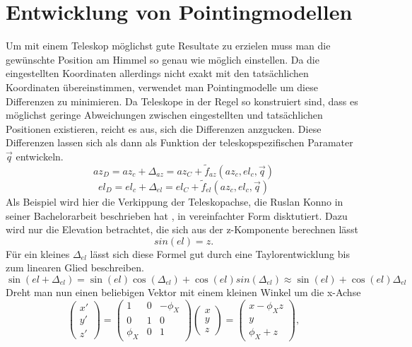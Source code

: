\section{Entwicklung von Pointingmodellen}
Um mit einem Teleskop möglichst gute Resultate zu erzielen muss man die gewünschte Position am Himmel so genau wie möglich einstellen. Da die eingestellten Koordinaten allerdings nicht exakt mit den tatsächlichen Koordinaten übereinstimmen, verwendet man Pointingmodelle um diese Differenzen zu minimieren. Da Teleskope in der Regel so konstruiert sind, dass es möglichst geringe Abweichungen zwischen eingestellten und tatsächlichen Positionen existieren, reicht es aus, sich die Differenzen anzgucken. Diese Differenzen lassen sich als dann als Funktion der teleskopspezifischen Paramater $\vec{q}$ entwickeln.
\begin{equation}
az_D=az_c+\Delta_{az}=az_C+\tilde{f}_{az}\left(az_c,el_c,\vec{q}\right)
\end{equation}
\begin{equation}
el_D=el_c+\Delta_{el}=el_C+\tilde{f}_{el}\left(az_c,el_c,\vec{q}\right)
\label{eq:pointingZero}
\end{equation}
Als Beispiel wird hier die Verkippung der Teleskopachse, die Ruslan Konno in seiner Bachelorarbeit beschrieben hat \cite{Ruslan}, in vereinfachter Form disktutiert. Dazu wird nur die Elevation betrachtet, die sich aus der z-Komponente berechnen lässt
\begin{equation}
sin(el)=z.
\end{equation}
Für ein kleines $\Delta_{el}$ lässt sich diese Formel gut durch eine Taylorentwicklung bis zum linearen Glied beschreiben.
\begin{equation}
\sin(el+\Delta_{el})=\sin(el)\cos(\Delta_{el})+\cos(el)sin(\Delta_{el})\approx \sin(el)+\cos(el)\Delta_{el}
\end{equation}
Dreht man nun einen beliebigen Vektor mit einem kleinen Winkel um die x-Achse
\begin{equation}
\left(\begin{array}{c}
x\prime\\y\prime\\z\prime
\end{array}\right)=\left(\begin{array}{ccc}
1 & 0 & -\phi_X\\0 & 1 & 0 \\\phi_X & 0 & 1
\end{array}\right)\left(\begin{array}{c}
x\\y\\z
\end{array}\right)=\left(\begin{array}{c}
x-\phi_Xz\\y\\\phi_X+z
\end{array}\right),
\end{equation}
